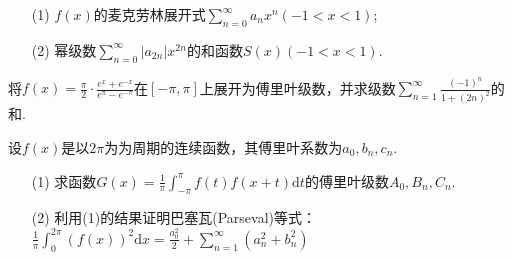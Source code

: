 \begin{xiti}
	\begin{enumerate}
		\item [(1)]$f(x)$的麦克劳林展开式$\sum _ { n = 0 } ^ { \infty } a _ { n } x ^ { n } ( - 1 < x < 1 )$;
		\item [(2)]幂级数$\sum _ { n = 0 } ^ { \infty } \left| a _ { 2 n } \right| x ^ { 2 n }$的和函数$S ( x ) ( - 1 < x < 1 )$.
	\end{enumerate}
	\item 将$f ( x ) = \frac { \pi } { 2 } \cdot \frac { e ^ { x } + e ^ { - x } } { e ^ { \pi } - e ^ { - \pi } }$在$[-\pi,\pi]$上展开为傅里叶级数，并求级数$\sum _ { n = 1 } ^ { \infty } \frac { ( - 1 ) ^ { n } } { 1 + ( 2 n ) ^ { 2 } }$的和.
	\item 设$f(x)$是以$2\pi$为为周期的连续函数，其傅里叶系数为$a_{0},b_{n},c_{n}$.
	\begin{enumerate}
		\item [(1)] 求函数$G ( x ) = \frac { 1 } { \pi } \int _ { - \pi } ^ { \pi } f ( t ) f ( x + t ) \mathrm { d } t$的傅里叶级数$A_{0},B_{n},C_{n}$.
		\item [(2)]利用(1)的结果证明巴塞瓦(Parseval)等式：$\frac { 1 } { \pi } \int _ { 0 } ^ { 2 \pi } ( f ( x ) ) ^ { 2 } \mathrm { d } x = \frac { a _ { 0 } ^ { 2 } } { 2 } + \sum _ { n = 1 } ^ { \infty } \left( a _ { n } ^ { 2 } + b _ { n } ^ { 2 } \right)$
	\end{enumerate}
\end{xiti}


